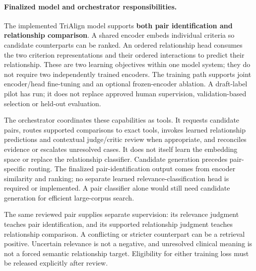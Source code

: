\documentclass[10pt,letterpaper]{article}
\begin{document}
\paragraph{Finalized model and orchestrator responsibilities.}
The implemented TriAlign model supports \textbf{both pair identification
and relationship comparison}. A shared encoder embeds individual criteria so
candidate counterparts can be ranked. An ordered relationship head consumes
the two criterion representations and their ordered interactions to predict their
relationship. These are two learning objectives within one model system;
they do not require two independently trained encoders. The training path
supports joint encoder/head fine-tuning and an optional frozen-encoder
ablation. A draft-label pilot has run; it does not replace approved human
supervision, validation-based selection or held-out evaluation.

The orchestrator coordinates these capabilities as tools. It requests candidate
pairs, routes supported comparisons to exact tools, invokes learned relationship
predictions and contextual judge/critic review when appropriate, and reconciles
evidence or escalates unresolved cases. It does not itself learn the embedding
space or replace the relationship classifier. Candidate generation precedes
pair-specific routing. The finalized pair-identification output comes from
encoder similarity and ranking; no separate learned relevance-classification
head is required or implemented. A pair classifier alone would still
need candidate generation for efficient large-corpus search.

The same reviewed pair supplies separate supervision: its relevance judgment
teaches pair identification, and its supported relationship judgment teaches
relationship comparison. A conflicting or stricter counterpart can be a
retrieval positive. Uncertain relevance is not a negative, and unresolved
clinical meaning is not a forced semantic relationship target. Eligibility
for either training loss must be released explicitly after review.
\end{document}
